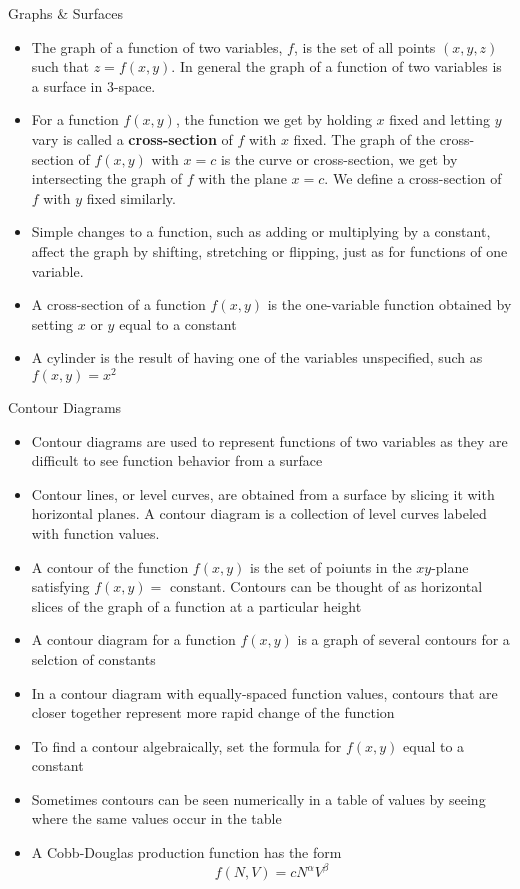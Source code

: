 \documentclass[12pt,letterpaper, onecolumn]{exam}
\begin{document}
		 Graphs \& Surfaces\\
		\begin{itemize}
		\item The graph of a function of two variables, $f$, is the set of all points $(x,y,z)$ such that $z=f(x,y)$. In general the graph of a function of two variables is a surface in 3-space.
		\item For a function $f(x,y)$, the function we get by holding $x$ fixed and letting $y$ vary is called a \textbf{cross-section} of $f$ with $x$ fixed. The graph of the cross-section of $f(x,y)$ with $x=c$ is the curve or cross-section, we get by intersecting the graph of $f$ with the plane $x=c$. We define a cross-section of $f$ with $y$ fixed similarly. 
		\item Simple changes to a function, such as adding or multiplying by a constant, affect the graph by shifting, stretching or flipping, just as for functions of one variable.
		\item A cross-section of a function $f(x,y)$ is the one-variable function obtained by setting $x$ or $y$ equal to a constant 
		\item A cylinder is the result of having one of the variables unspecified, such as $f(x,y)=x^2$
		\end{itemize}
		 Contour Diagrams
		\begin{itemize}
			\item Contour diagrams are used to represent functions of two variables as they are difficult to see function behavior from a surface
			\item Contour lines, or level curves, are obtained from a surface by slicing it with horizontal planes. A contour diagram is a collection of level curves labeled with function values.
			\item A contour of the function $f(x,y)$ is the set of poiunts in the $xy$-plane satisfying $f(x,y)=$ constant. Contours can be thought of as horizontal slices of the graph of a function at a particular height
			\item A contour diagram for a function $f(x,y)$ is a graph of several contours for a selction of constants
			\item In a contour diagram with equally-spaced function values, contours that are closer together represent more rapid change of the function
			\item To find a contour algebraically, set the formula for $f(x,y)$ equal to a constant
			\item Sometimes contours can be seen numerically in a table of values by seeing where the same values occur in the table
			\item A Cobb-Douglas production function has the form
			$$f(N,V)=cN^{\alpha}V^{\beta}$$
		\end{itemize}
\end{document}
